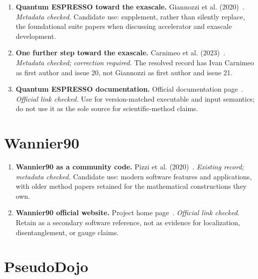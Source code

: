 \begin{enumerate}
  \item \textbf{Quantum ESPRESSO toward the exascale.}
    Giannozzi et al. (2020)~\cite{giannozzi2020}. \emph{Metadata checked.}
    Candidate use: supplement, rather than silently replace, the foundational
    suite papers when discussing accelerator and exascale development.

  \item \textbf{One further step toward the exascale.}
    Carnimeo et al. (2023)~\cite{carnimeo2023}. \emph{Metadata checked;
    correction required.} The resolved record has Ivan Carnimeo as first author
    and issue 20, not Giannozzi as first author and issue 21.

  \item \textbf{Quantum ESPRESSO documentation.}
    Official documentation page~\cite{quantumEspressoDocumentation}.
    \emph{Official link checked.} Use for version-matched executable and input
    semantics; do not use it as the sole source for scientific-method claims.
\end{enumerate}

\section{Wannier90}

\begin{enumerate}
  \item \textbf{Wannier90 as a community code.}
    Pizzi et al. (2020)~\cite{pizzi2020}. \emph{Existing record; metadata
    checked.} Candidate use: modern software features and applications, with
    older method papers retained for the mathematical constructions they own.

  \item \textbf{Wannier90 official website.}
    Project home page~\cite{wannier90Website}. \emph{Official link checked.}
    Retain as a secondary software reference, not as evidence for localization,
    disentanglement, or gauge claims.
\end{enumerate}

\section{PseudoDojo}

